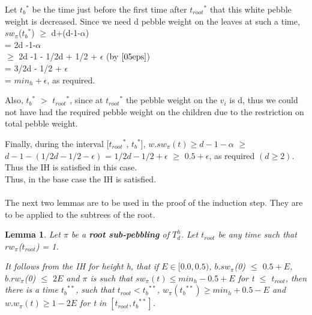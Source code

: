 \documentclass[12pt]{article}
\newtheorem{lemma}[theorem]{Lemma}
\newcommand{\troot}{t_{root}}
\newcommand{\troots}{{t_{root}}^*}
\newcommand{\tbss}{{t_b}^{**}}
\newcommand{\tbs}{{t_b}^{*}}
\begin{document}
Let $\tbs$ be the time just before the first time after $\troots$ that this
white pebble weight is decreased.  Since we need d pebble weight on the leaves at such a time,\\
$sw_\pi$($\tbs$) $\ge$ d+(d-1-$\alpha$) \\
= 2d -1-$\alpha$ \\
$\ge$ 2d -1 - 1/2d + 1/2 + $\epsilon$ (by $\ref{05eps}$)\\
= 3/2d - 1/2 + $\epsilon$ \\
= $min_h + \epsilon$, as required.

Also, $\tbs$ $>$ $\troots$, since at $\troots$ the pebble weight on the $v_i$ is d, thus we could not have had the required pebble weight on the children due to the restriction on total pebble weight.

Finally, during the interval [$\troots$, $\tbs$], $w.sw_\pi(t) \geq d-1-\alpha$ $\ge$ $d-1 - (1/2d - 1/2 - \epsilon)$  = $1/2d -1/2  + \epsilon$ $\geq$ $0.5 +  \epsilon$, as required $(d \geq 2)$. Thus the IH is satisfied in this case.\\

Thus, in the base case the IH is satisfied.\\\\





The next two lemmas are to be used in the proof of the induction step. They are to be applied to the subtrees of the root.

\begin{lemma} \label{flb1}
Let $\pi$ be a {\bf root sub-pebbling}
of $T^h_d$. Let $\troot$ be any time such that $rw_\pi$($\troot$) = 1.

It follows from the IH for height h, that if $E \in [0.0, 0.5)$, $b.sw_{\pi}$(0) $\leq$ $0.5+E$, $b.rw_{\pi}$(0) $\leq$ $2E$ and $\pi$ is such that $sw_\pi(t) \leq min_h-0.5+E$ for t $\leq$ $\troot$, then there is a time $\tbss$, such that $\troot<\tbss$, $w_\pi(\tbss) \geq min_h+0.5-E$ and $w.w_\pi(t) \geq 1-2E$ for t in $[\troot, \tbss]$.\\

\end{lemma}
\end{document}
